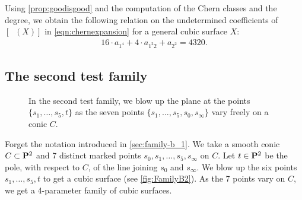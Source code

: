\documentclass[reqno]{amsart}
\DeclareMathOperator{\Orb}{\overline{Orb}}
\renewcommand {\P}{{\bf P}}
\numberwithin{equation}{section}
\begin{document}
Using \autoref{prop:goodisgood} and the computation of the Chern classes and the degree, we obtain the following relation on the undetermined coefficients of $[\Orb(X)]$ in
\eqref{eqn:chernexpansion} for a general cubic surface $X$:
\begin{align}
  \label{eq:relation1}
  16 \cdot a_{1^4} + 4 \cdot a_{1^2 2} + a_{2^2} = 4320.
\end{align}


\subsection{The second test family}
\label{sec:family-b_2}
\begin{figure}
    \centering


    \caption{
      In the second test family, we blow up the plane at the points $\{s_{1}, \dots, s_{5}, t\}$ as the seven points $\{s_1, \dots, s_5, s_0, s_{\infty}\}$ vary freely on a conic $C$.}
    \label{fig:FamilyB2}
  \end{figure}
Forget the notation introduced in \autoref{sec:family-b_1}.
We take a smooth conic $C \subset \P^2$ and 7 distinct marked points $s_0, s_1, \dots, s_5, s_{\infty}$ on $C$.
Let $t \in \P^2$ be the pole, with respect to $C$, of the line joining $s_0$ and $s_{\infty}$.
We blow up the six points $s_1,\dots, s_5, t$ to get a cubic surface (see \autoref{fig:FamilyB2}).
As the 7 points vary on $C$, we get a 4-parameter family of cubic surfaces.
\end{document}
